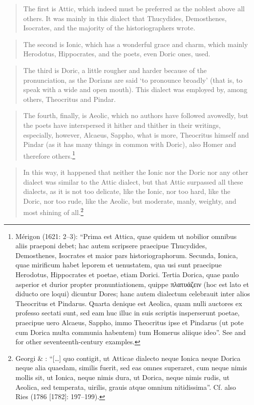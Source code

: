 \begin{quote}
The first is Attic, which indeed must be preferred as the noblest above all others. It was mainly in this dialect that Thucydides, Demosthenes, Isocrates, and the majority of the historiographers wrote.
\end{quote}

\begin{quote}
The second is Ionic, which has a wonderful grace and charm, which mainly Herodotus, Hippocrates, and the poets, even Doric ones, used.
\end{quote}

\begin{quote}
The third is Doric, a little rougher and harder because of the pronunciation, as the Dorians are said ‘to pronounce broadly’ (that is, to speak with a wide and open mouth). This dialect was employed by, among others, Theocritus and Pindar.
\end{quote}

\begin{quote}
The fourth, finally, is Aeolic, which no authors have followed avowedly, but the poets have interspersed it hither and thither in their writings, especially, however, Alcaeus, Sappho, what is more, Theocritus himself and Pindar (as it has many things in common with Doric), also Homer and therefore others.\footnote{Mérigon (1621: 2–3): “Prima est Attica, quae quidem ut nobilior omnibus aliis praeponi debet; hac autem scripsere praecipue Thucydides, Demosthenes, Isocrates et maior pars historiographorum. Secunda, Ionica, quae mirificum habet leporem et uenustatem, qua usi sunt praecipue Herodotus, Hippocrates et poetae, etiam Dorici. Tertia Dorica, quae paulo asperior et durior propter pronuntiationem, quippe πλατυάζειν (hoc est lato et diducto ore loqui) dicuntur Dores; hanc autem dialectum celebrauit inter alios Theocritus et Pindarus. Quarta denique est Aeolica, quam nulli auctores ex professo sectati sunt, sed eam huc illuc in suis scriptis insperserunt poetae, praecipue uero Alcaeus, Sappho, immo Theocritus ipse et Pindarus (ut pote cum Dorica multa communia habentem) tum Homerus aliique ideo”. See \citet{Hoius1620} and \citet{Rhenius1626} for other seventeenth-century examples.}
\end{quote}

\begin{quote}
In this way, it happened that neither the Ionic nor the Doric nor any other dialect was similar to the Attic dialect, but that Attic surpassed all these dialects, as it is not too delicate, like the Ionic, nor too hard, like the Doric, nor too rude, like the Aeolic, but moderate, manly, weighty, and most shining of all.\footnote{Georgi \& \citet[6]{Graun1729}: “[…] quo contigit, ut Atticae dialecto neque Ionica neque Dorica neque alia quaedam, similis fuerit, sed eas omnes superaret, cum neque nimis mollis sit, ut Ionica, neque nimis dura, ut Dorica, neque nimis rudis, ut Aeolica, sed temperata, uirilis, grauis atque omnium nitidissima”. Cf. also Ries (1786 [1782]: 197–199).}
\end{quote}

